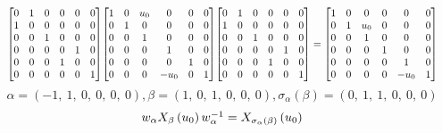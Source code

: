 \documentclass[11pt]{article}
\theoremstyle{definition}
\begin{document}
\[
\scaletoalign{\textwidth}{{\left[\begin{matrix}0 & 1 & 0 & 0 & 0 & 0\\1 & 0 & 0 & 0 & 0 & 0\\0 & 0 & 1 & 0 & 0 & 0\\0 & 0 & 0 & 0 & 1 & 0\\0 & 0 & 0 & 1 & 0 & 0\\0 & 0 & 0 & 0 & 0 & 1\end{matrix}\right]} {\left[\begin{matrix}1 & 0 & u_{0} & 0 & 0 & 0\\0 & 1 & 0 & 0 & 0 & 0\\0 & 0 & 1 & 0 & 0 & 0\\0 & 0 & 0 & 1 & 0 & 0\\0 & 0 & 0 & 0 & 1 & 0\\0 & 0 & 0 & - u_{0} & 0 & 1\end{matrix}\right]} {\left[\begin{matrix}0 & 1 & 0 & 0 & 0 & 0\\1 & 0 & 0 & 0 & 0 & 0\\0 & 0 & 1 & 0 & 0 & 0\\0 & 0 & 0 & 0 & 1 & 0\\0 & 0 & 0 & 1 & 0 & 0\\0 & 0 & 0 & 0 & 0 & 1\end{matrix}\right]} = {\left[\begin{matrix}1 & 0 & 0 & 0 & 0 & 0\\0 & 1 & u_{0} & 0 & 0 & 0\\0 & 0 & 1 & 0 & 0 & 0\\0 & 0 & 0 & 1 & 0 & 0\\0 & 0 & 0 & 0 & 1 & 0\\0 & 0 & 0 & 0 & - u_{0} & 1\end{matrix}\right]}}
\]
\[
\alpha = \left( -1, \  1, \  0, \  0, \  0, \  0\right), \beta = \left( 1, \  0, \  1, \  0, \  0, \  0\right), \sigma_{\alpha}(\beta) = \left( 0, \  1, \  1, \  0, \  0, \  0\right)
\]
\[
\scaletoalign{\textwidth}{w_{\alpha} X_{\beta}\left(u_{0}\right) w_{\alpha}^{-1} = X_{\sigma_{\alpha}\left(\beta\right)}\left(u_{0}\right)}
\]
\end{document}
